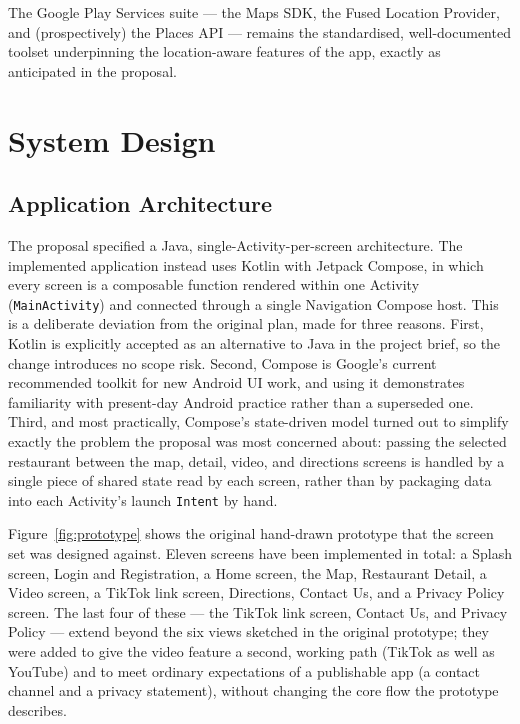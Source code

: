 \documentclass[12pt, a4paper]{article}
\begin{document}
The Google Play Services suite — the Maps SDK, the Fused Location Provider, and (prospectively) the Places API — remains the standardised, well-documented toolset underpinning the location-aware features of the app, exactly as anticipated in the proposal.

\section{System Design}

\subsection{Application Architecture}

The proposal specified a Java, single-Activity-per-screen architecture. The implemented application instead uses Kotlin with Jetpack Compose, in which every screen is a composable function rendered within one Activity (\texttt{MainActivity}) and connected through a single Navigation Compose host. This is a deliberate deviation from the original plan, made for three reasons. First, Kotlin is explicitly accepted as an alternative to Java in the project brief, so the change introduces no scope risk. Second, Compose is Google's current recommended toolkit for new Android UI work, and using it demonstrates familiarity with present-day Android practice rather than a superseded one. Third, and most practically, Compose's state-driven model turned out to simplify exactly the problem the proposal was most concerned about: passing the selected restaurant between the map, detail, video, and directions screens is handled by a single piece of shared state read by each screen, rather than by packaging data into each Activity's launch \texttt{Intent} by hand.

Figure~\ref{fig:prototype} shows the original hand-drawn prototype that the screen set was designed against. Eleven screens have been implemented in total: a Splash screen, Login and Registration, a Home screen, the Map, Restaurant Detail, a Video screen, a TikTok link screen, Directions, Contact Us, and a Privacy Policy screen. The last four of these — the TikTok link screen, Contact Us, and Privacy Policy — extend beyond the six views sketched in the original prototype; they were added to give the video feature a second, working path (TikTok as well as YouTube) and to meet ordinary expectations of a publishable app (a contact channel and a privacy statement), without changing the core flow the prototype describes.
\end{document}
